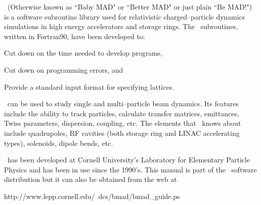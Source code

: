 
\bmad\ (Otherwise known as ``Baby MAD" or ``Better MAD" or just 
plain ``Be MAD!")  is a software subroutine library used for
relativistic charged--particle dynamics simulations in high energy
accelerators and storage rings. The \bmad\ subroutines, written in
Fortran90, have been developed to:
\begin{Itemize}
\item Cut down on the time needed to develop programs,
\item Cut down on programming errors, and
\item Provide a standard input format for specifying lattices.
\end{Itemize}

\bmad\ can be used to study single and multi--particle beam dynamics. Its 
features include the ability to track particles, calculate transfer matrices,
emittances, Twiss parameters, 
dispersion, coupling, etc. The elements that \bmad\ knows about include
quadrupoles, RF cavities (both storage ring and LINAC accelerating types),
solenoids, dipole bends, etc. 

\bmad\ has been developed at Cornell University's Laboratory for Elementary
Particle Physics and has been in use since the 1990's. This manual is part of the 
\bmad\ software distribution but it can also be obtained from the web at
\begin{example}
  http://www.lepp.cornell.edu/~dcs/bmad/bmad_guide.ps
\end{example}
\vfill
\break
